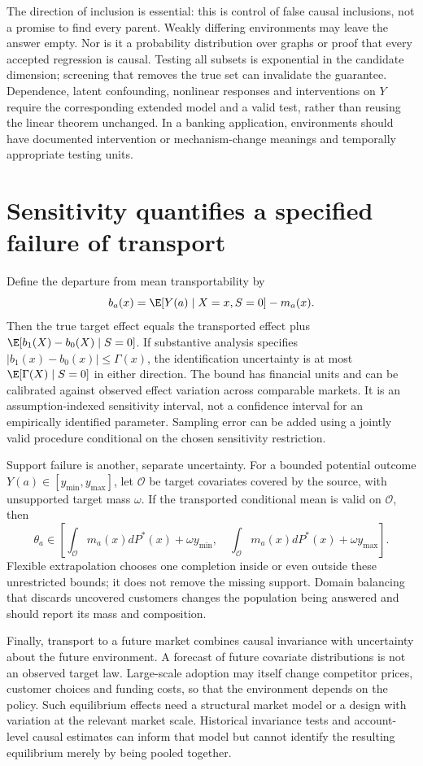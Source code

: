 The direction of inclusion is essential: this is control of false
causal inclusions, not a promise to find every parent. Weakly differing
environments may leave the answer empty. Nor is it a probability
distribution over graphs or proof that every accepted regression is
causal. Testing all subsets is exponential in the candidate dimension;
screening that removes the true set can invalidate the guarantee.
Dependence, latent confounding, nonlinear responses and interventions
on $Y$ require the corresponding extended model and a valid test,
rather than reusing the linear theorem unchanged. In a banking
application, environments should have documented intervention or
mechanism-change meanings and temporally appropriate testing units.

\section{Sensitivity quantifies a specified failure of transport}
\label{r3:transport-sensitivity}
Define the departure from mean transportability by
\[
 b_a(x)=\E[Y(a)\mid X=x,S=0]-m_a(x).
\]
Then the true target effect equals the transported effect plus
$\E[b_1(X)-b_0(X)\mid S=0]$. If substantive analysis specifies
$|b_1(x)-b_0(x)|\le\Gamma(x)$, the identification uncertainty is
at most $\E[\Gamma(X)\mid S=0]$ in either direction. The bound
has financial units and can be calibrated against observed effect
variation across comparable markets. It is an assumption-indexed
sensitivity interval, not a confidence interval for an empirically
identified parameter. Sampling error can be added using a jointly
valid procedure conditional on the chosen sensitivity restriction.

Support failure is another, separate uncertainty. For a bounded
potential outcome $Y(a)\in[y_{\min},y_{\max}]$, let $\mathcal O$
be target covariates covered by the source, with unsupported target
mass $\omega$. If the transported conditional mean is valid on
$\mathcal O$, then
\[
 \theta_a\in\left[
  \int_{\mathcal O}m_a(x)dP^*(x)+\omega y_{\min},\quad
  \int_{\mathcal O}m_a(x)dP^*(x)+\omega y_{\max}\right].
\]
Flexible extrapolation chooses one completion inside or even outside
these unrestricted bounds; it does not remove the missing support.
Domain balancing that discards uncovered customers changes the
population being answered and should report its mass and composition.

Finally, transport to a future market combines causal invariance
with uncertainty about the future environment. A forecast of future
covariate distributions is not an observed target law. Large-scale
adoption may itself change competitor prices, customer choices and
funding costs, so that the environment depends on the policy. Such
equilibrium effects need a structural market model or a design with
variation at the relevant market scale. Historical invariance tests
and account-level causal estimates can inform that model but cannot
identify the resulting equilibrium merely by being pooled together.
